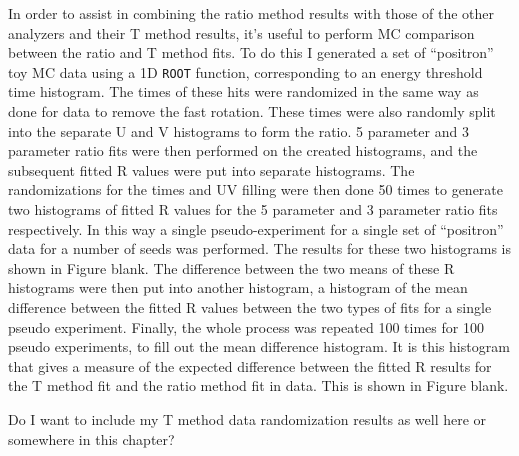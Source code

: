 In order to assist in combining the ratio method results with those of the other analyzers and their T method results, it's useful to perform MC comparison between the ratio and T method fits. To do this I generated a set of ``positron'' toy MC data using a 1D \texttt{ROOT} function, corresponding to an energy threshold time histogram. The times of these hits were randomized in the same way as done for data to remove the fast rotation. These times were also randomly split into the separate U and V histograms to form the ratio. 5 parameter and 3 parameter ratio fits were then performed on the created histograms, and the subsequent fitted R values were put into separate histograms. The randomizations for the times and UV filling were then done 50 times to generate two histograms of fitted R values for the 5 parameter and 3 parameter ratio fits respectively. 
In this way a single pseudo-experiment for a single set of ``positron'' data for a number of seeds was performed. The results for these two histograms is shown in Figure blank. The difference between the two means of these R histograms were then put into another histogram, a histogram of the mean difference between the fitted R values between the two types of fits for a single pseudo experiment. Finally, the whole process was repeated 100 times for 100 pseudo experiments, to fill out the mean difference histogram. It is this histogram that gives a measure of the expected difference between the fitted R results for the T method fit and the ratio method fit in data. This is shown in Figure blank.




Do I want to include my T method data randomization results as well here or somewhere in this chapter?












